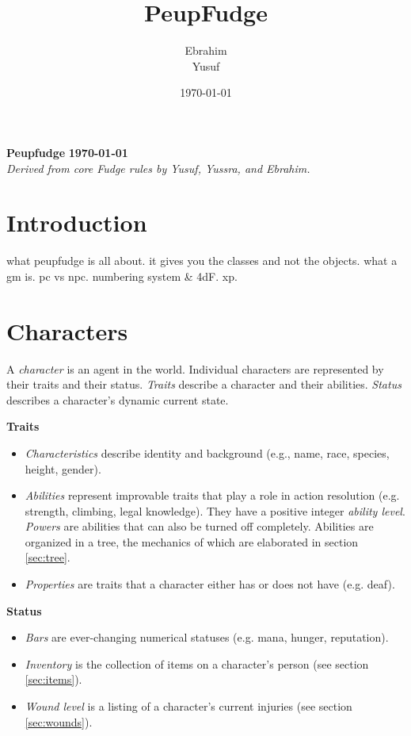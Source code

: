 \documentclass[12pt]{article}
\title{PeupFudge}
\author{Ebrahim \\ Yusuf}
\date{\today}
\newcommand{\notes}[1]{{\color{Tan} #1}}
\begin{document}
\textbf{Peupfudge}
\hfill
\textbf{\today}\\
\textit{Derived from core Fudge rules by Yusuf, Yussra, and Ebrahim.}

\section{Introduction}
\notes{what peupfudge is all about. it gives you the classes and not the objects. what a gm is. pc vs npc. numbering system \& 4dF. xp.}

\section{Characters}
A \emph{character} is an agent in the world.
Individual characters are represented by their traits and their status.
\emph{Traits} describe a character and their abilities.
\emph{Status} describes a character's dynamic current state.

\textbf{Traits}\vspace{-6mm}
\begin{itemize}
\item \emph{Characteristics}
describe identity and background
(e.g., name, race, species, height, gender).
\item \emph{Abilities}
represent improvable traits that play a role in action resolution
(e.g. strength, climbing, legal knowledge).
They have a positive integer \emph{ability level}.
\emph{Powers} are abilities that can also be turned off completely.
Abilities are organized in a tree, the mechanics of which are elaborated in section \ref{sec:tree}.
\item \emph{Properties} are traits that a character either has or does not have (e.g. deaf).
\end{itemize}

\textbf{Status}\vspace{-6mm}
\begin{itemize}
\item \emph{Bars} are ever-changing numerical statuses (e.g. mana, hunger, reputation).
\item \emph{Inventory} is the collection of items on a character's person (see section \ref{sec:items}).
\item \emph{Wound level} is a listing of a character's current injuries (see section \ref{sec:wounds}).
\end{itemize}
\end{document}
